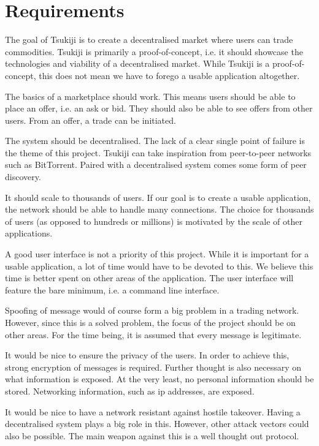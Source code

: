 \section{Requirements}
The goal of Tsukiji is to create a decentralised market where users can trade commodities.
Tsukiji is primarily a proof-of-concept, i.e. it should showcase the technologies and viability of a decentralised market.
While Tsukiji is a proof-of-concept, this does not mean we have to forego a usable application altogether.

The basics of a marketplace should work.
This means users should be able to place an offer, i.e. an ask or bid.
They should also be able to see offers from other users.
From an offer, a trade can be initiated.

The system should be decentralised.
The lack of a clear single point of failure is the theme of this project.
Tsukiji can take inspiration from peer-to-peer networks such as BitTorrent.
Paired with a decentralised system comes some form of peer discovery.

It should scale to thousands of users.
If our goal is to create a usable application, the network should be able to handle many connections.
The choice for thousands of users (as opposed to hundreds or millions) is motivated by the scale of other applications. %

A good user interface is not a priority of this project.
While it is important for a usable application, a lot of time would have to be devoted to this.
We believe this time is better spent on other areas of the application.
The user interface will feature the bare minimum, i.e. a command line interface.

Spoofing of message would of course form a big problem in a trading network.
However, since this is a solved problem, the focus of the project should be on other areas.
For the time being, it is assumed that every message is legitimate.

It would be nice to ensure the privacy of the users.
In order to achieve this, strong encryption of messages is required.
Further thought is also necessary on what information is exposed.
At the very least, no personal information should be stored.
Networking information, such as ip addresses, are exposed.

It would be nice to have a network resistant against hostile takeover.
Having a decentralised system plays a big role in this.
However, other attack vectors could also be possible.
The main weapon against this is a well thought out protocol.

